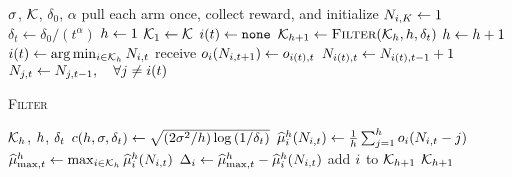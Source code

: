 \begin{algorithm}[t]
\caption{\myAlgorithm}
\label{EWA}
\begin{algorithmic}[1]
\REQUIRE $\sigma$, $\mathcal{K}$, $\delta_0$, $\alpha$
	\STATE pull each arm once, collect reward, and initialize $N_{i,K} \leftarrow 1$ 
		\STATE $\delta_t \leftarrow \delta_0/(t^\alpha)$
		\STATE $h \leftarrow 1$ 
		{\footnotesize {}}
		\STATE $\mathcal{K}_1 \leftarrow \mathcal{K}$ 
		{\footnotesize {}}
		\STATE $i(t) \gets {\tt none}$
			\STATE $\mathcal{K}_{h+1} \leftarrow {\textsc{Filter}}(\mathcal{K}_{h} ,h, \delta_t)$
			\STATE $h \leftarrow h+1$ \label{algline:window}
			\label{algline:condition}
			\STATE $i(t) \leftarrow \arg\min_{i\in\mathcal{K}_{h}} N_{i,t}$
			\ENDIF
		\ENDWHILE
		\STATE  receive $o_i(N_{i,t +1 }) \leftarrow o_{i(t),t}$
		\STATE $N_{i(t),t} \leftarrow N_{i(t),t-1} +1$
		\STATE $N_{j,t} \leftarrow N_{j, t-1}, \quad \forall j \neq i(t)$
	\ENDFOR
\end{algorithmic}

\end{algorithm}

%
\begin{algorithm}[t]
\caption{{\textsc{Filter}}}
\label{filter}
\begin{algorithmic}[1]
\REQUIRE $\mathcal{K}_{h}$, $h$, $\delta_t$
\STATE $c(h, \sigma, \delta_t) \leftarrow \sqrt{(2\sigma^2/h) \log{(1/\delta_t)}}$
\FOR{$ \arm \in \possibleArms_{\window}$}
\STATE $\widehat{\mu}^h_i(N_{i,t}) \leftarrow \frac{1}{h} \sum_{j=1}^h o_i(N_{i,t} -j)$
\ENDFOR
\STATE $\widehat{\mu}^h_{\max,t}  \leftarrow \max_{i \in \mathcal{K}_{h}}\widehat{\mu}^h_i(N_{i,t})$
\FOR{$ \arm \in \possibleArms_{\window}$}
	\STATE $\Delta_i \leftarrow  \widehat{\mu}^h_{\max,t}  - \widehat{\mu}^h_i(N_{i,t})$
	\STATE add $i$ to $\mathcal{K}_{h+1}$
	\ENDIF
\ENDFOR
\ENSURE $\mathcal{K}_{h+1}$
\end{algorithmic}
\end{algorithm}



